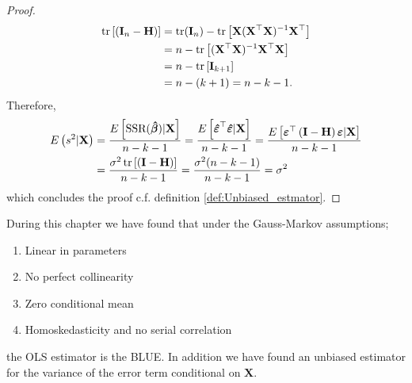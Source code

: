 \begin{proof}
    \begin{align*}
        \operatorname{\text{tr}}\left[\left(\mathbf{I}_n - \mathbf{H}\right)\right] &= \operatorname{\text{tr}}(\mathbf{I}_n) - \operatorname{\text{tr}}\left[\mathbf{X}(\mathbf{X}^\top\mathbf{X})^{-1}\mathbf{X}^\top\right] \\
        &= n - \operatorname{\text{tr}}\left[ (\mathbf{X}^\top\mathbf{X})^{-1}\mathbf{X}^\top\mathbf{X} \right] \\
         &= n - \operatorname{\text{tr}}\left[\mathbf{I}_{k + 1} \right] \\
        &= n - (k + 1) = n - k - 1.
    \end{align*}
    Therefore,
    \begin{align*}
        E\left(s^2|\mathbf{X}\right) &= \frac{E\left[\operatorname{\text{SSR}}(\operatorname{\boldsymbol{\hat{\beta}}})|\textbf{X}\right]}{n - k - 1} = \frac{E\left[\boldsymbol{\hat{\varepsilon}}^\top\boldsymbol{\hat{\varepsilon}}|\textbf{X}\right]}{n - k - 1}= \frac{ E\left[\boldsymbol{\varepsilon}^\top \left(\mathbf{I} - \mathbf{H}\right)\boldsymbol{\varepsilon}|\mathbf{X}\right]}{n - k - 1} \\ &= \frac{\sigma^2\operatorname{\text{tr}}\left[\left(\mathbf{I} - \mathbf{H}\right)\right]}{n - k - 1} = \frac{\sigma^2(n - k - 1)}{n - k - 1} = \sigma^2
    \end{align*}
    which concludes the proof c.f. definition \ref{def:Unbiased_estmator}.
\end{proof}
During this chapter we have found that under the Gauss-Markov assumptions;
\begin{enumerate}
    \item Linear in parameters
    \item No perfect collinearity
    \item Zero conditional mean
    \item Homoskedasticity and no serial correlation
\end{enumerate}
 the OLS estimator is the BLUE. 
 In addition we have found an unbiased estimator for the variance of the error term conditional on $\textbf{X}$.
